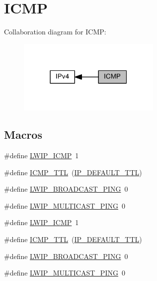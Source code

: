\hypertarget{group__lwip__opts__icmp}{}\section{I\+C\+MP}
\label{group__lwip__opts__icmp}
Collaboration diagram for I\+C\+MP\+:
\nopagebreak
\begin{figure}[H]
\begin{center}
\leavevmode
\includegraphics[width=195pt]{group__lwip__opts__icmp}
\end{center}
\end{figure}
\subsection*{Macros}
\begin{DoxyCompactItemize}
\item 
\#define \hyperlink{group__lwip__opts__icmp_gae4d45345c3ab8e5a355fda1d8d24fca6}{L\+W\+I\+P\+\_\+\+I\+C\+MP}~1
\item 
\#define \hyperlink{group__lwip__opts__icmp_gae1533f2bc39a5843989909555f6ce0cf}{I\+C\+M\+P\+\_\+\+T\+TL}~(\hyperlink{group__lwip__opts__ipv4_ga556b9b58fd02c0fdd126791baef77411}{I\+P\+\_\+\+D\+E\+F\+A\+U\+L\+T\+\_\+\+T\+TL})
\item 
\#define \hyperlink{group__lwip__opts__icmp_ga8088cb56d1a84fe554b11bc15d84b2b9}{L\+W\+I\+P\+\_\+\+B\+R\+O\+A\+D\+C\+A\+S\+T\+\_\+\+P\+I\+NG}~0
\item 
\#define \hyperlink{group__lwip__opts__icmp_gaf77baf0a83b04312eab4c006ef229661}{L\+W\+I\+P\+\_\+\+M\+U\+L\+T\+I\+C\+A\+S\+T\+\_\+\+P\+I\+NG}~0
\item 
\#define \hyperlink{group__lwip__opts__icmp_gae4d45345c3ab8e5a355fda1d8d24fca6}{L\+W\+I\+P\+\_\+\+I\+C\+MP}~1
\item 
\#define \hyperlink{group__lwip__opts__icmp_gae1533f2bc39a5843989909555f6ce0cf}{I\+C\+M\+P\+\_\+\+T\+TL}~(\hyperlink{group__lwip__opts__ipv4_ga556b9b58fd02c0fdd126791baef77411}{I\+P\+\_\+\+D\+E\+F\+A\+U\+L\+T\+\_\+\+T\+TL})
\item 
\#define \hyperlink{group__lwip__opts__icmp_ga8088cb56d1a84fe554b11bc15d84b2b9}{L\+W\+I\+P\+\_\+\+B\+R\+O\+A\+D\+C\+A\+S\+T\+\_\+\+P\+I\+NG}~0
\item 
\#define \hyperlink{group__lwip__opts__icmp_gaf77baf0a83b04312eab4c006ef229661}{L\+W\+I\+P\+\_\+\+M\+U\+L\+T\+I\+C\+A\+S\+T\+\_\+\+P\+I\+NG}~0
\end{DoxyCompactItemize}


